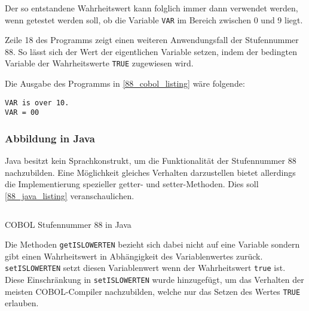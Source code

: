 Der so entstandene Wahrheitswert kann folglich immer dann verwendet werden, wenn getestet werden soll, ob die Variable \texttt{VAR} im Bereich zwischen 0 und 9 liegt.

Zeile 18 des Programms zeigt einen weiteren Anwendungsfall der Stufennummer 88. So lässt sich der Wert der eigentlichen Variable setzen, indem der bedingten Variable der Wahrheitswerte \texttt{TRUE} zugewiesen wird.

Die Ausgabe des Programms in \autoref{88_cobol_listing} wäre folgende:
\begin{verbatim}
VAR is over 10.
VAR = 00
\end{verbatim}

\subsubsection*{Abbildung in Java}
Java besitzt kein Sprachkonstrukt, um die Funktionalität der Stufennummer 88 nachzubilden. Eine Möglichkeit gleiches Verhalten darzustellen bietet allerdings die Implementierung spezieller getter- und setter-Methoden. Dies soll \autoref{88_java_listing} veranschaulichen.

\begin{listing}[H]
  \inputminted[bgcolor=mintedgrey,xleftmargin=20pt,linenos,fontsize=\footnotesize]{java}{code/88_section.java.txt}
  \caption{COBOL Stufennummer 88 in Java}
  \label{88_java_listing}
\end{listing} 

Die Methoden \texttt{getISLOWERTEN} bezieht sich dabei nicht auf eine Variable sondern gibt einen Wahrheitswert in Abhängigkeit des Variablenwertes zurück. \texttt{setISLOWERTEN} setzt diesen Variablenwert wenn der Wahrheitswert \texttt{true} ist. Diese Einschränkung in \texttt{setISLOWERTEN} wurde hinzugefügt, um das Verhalten der meisten COBOL-Compiler nachzubilden, welche nur das Setzen des Wertes \texttt{TRUE} erlauben.

